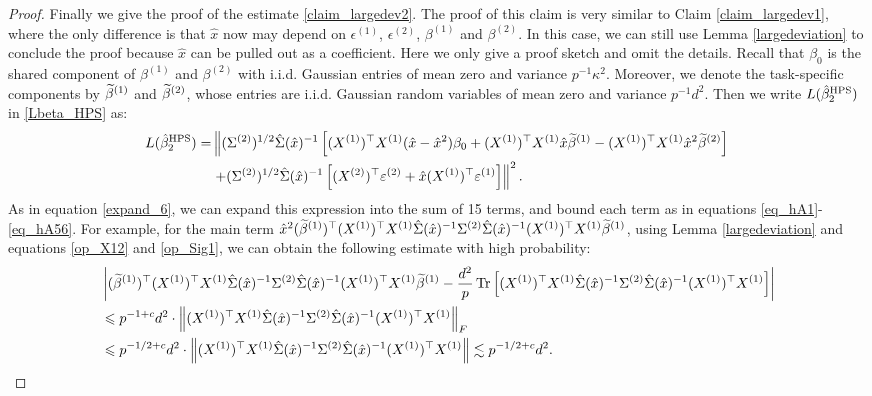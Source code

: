 \begin{proof}
Finally we give the proof of the estimate \eqref{claim_largedev2}.
The proof of this claim is very similar to Claim \ref{claim_largedev1}, where the only difference is that $\hat x$ now may depend on $\epsilon^{(1)}$, $\epsilon^{(2)}$, $\beta^{(1)}$ and $\beta^{(2)}$.
In this case, we can still use  Lemma \ref{largedeviation} to conclude the proof because $\hat x$ can be pulled out as a coefficient.
Here we only give a proof sketch and omit the details.
Recall that $\beta_0$ is the shared component of $\beta^{(1)}$ and $\beta^{(2)}$ with i.i.d. Gaussian entries of mean zero and variance $p^{-1}\kappa^2$. Moreover, we denote the task-specific components by $\widetilde\beta^{(1)}$ and $\widetilde\beta^{(2)}$, whose entries are i.i.d. Gaussian random variables of mean zero and variance $p^{-1} d^2 $. Then we write $L(\hat{\beta}_2^{\textup{HPS}}) $ in \eqref{Lbeta_HPS} as:
\begin{align}
L(\hat{\beta}_2^{\textup{HPS}})  =&  \left\| (\Sigma^{(2)})^{1/2}\hat \Sigma(\hat x)^{-1} \left[(X^{(1)})^\top X^{(1)} (\hat x -\hat x^2)\beta_0+(X^{(1)})^\top X^{(1)} \hat x\widetilde \beta^{(1)} - (X^{(1)})^\top X^{(1)}  \hat x^2\widetilde \beta^{(2)} \right] \right. \nonumber\\
&\left. + (\Sigma^{(2)})^{1/2}\hat \Sigma(\hat x)^{-1}\left[ (X^{(2)})^\top \varepsilon^{(2)} + \hat x   (X^{(1)})^\top \varepsilon^{(1)} \right]\right\|^2. \label{expand_15}
\end{align}
As in equation \eqref{expand_6}, we can expand this expression into the sum of 15 terms, and bound each term as in equations \eqref{eq_hA1}-\eqref{eq_hA56}. For example, for the main term $\hat x^2 (\widetilde \beta^{(1)})^\top (X^{(1)})^\top X^{(1)} \hat \Sigma(\hat x)^{-1}  \Sigma^{(2)} \hat \Sigma(\hat x)^{-1}  (X^{(1)})^\top X^{(1)}\widetilde\beta^{(1)}$, using 
Lemma \ref{largedeviation} and equations \eqref{op_X12} and \eqref{op_Sig1}, we can obtain the following estimate with high probability:
\begin{align*}
&  \left| (\wt \beta^{(1)})^\top (X^{(1)})^\top X^{(1)} \hat \Sigma(\hat x)^{-1}  \Sigma^{(2)} \hat \Sigma(\hat x)^{-1}  (X^{(1)})^\top X^{(1)}\wt\beta^{(1)} - \frac{d^2}{p}\bigtr{(X^{(1)})^\top X^{(1)} \hat \Sigma(\hat x)^{-1}  \Sigma^{(2)} \hat \Sigma(\hat x)^{-1}  (X^{(1)})^\top X^{(1)}}\right| \\
&\le p^{-1+c}d^2 \cdot \left\| (X^{(1)})^\top X^{(1)} \hat \Sigma(\hat x)^{-1}  \Sigma^{(2)} \hat \Sigma(\hat x)^{-1}  (X^{(1)})^\top X^{(1)} \right\|_F \\
&\le p^{-1/2+c}d^2 \cdot  \left\| (X^{(1)})^\top X^{(1)} \hat \Sigma(\hat x)^{-1}  \Sigma^{(2)} \hat \Sigma(\hat x)^{-1}  (X^{(1)})^\top X^{(1)} \right\|  \lesssim p^{-1/2+c}d^2.

\end{align*}
\end{proof}
